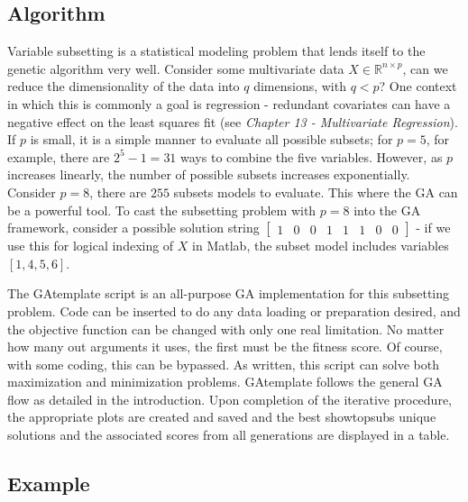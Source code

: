 \documentclass{book}
\newcommand{\textcode}[1]{\textsf{\small #1}}   %
\begin{document}
\subsection*{Algorithm}

Variable subsetting is a statistical modeling problem that lends itself to
the genetic algorithm very well. Consider some multivariate data $X\in
\mathbb{R}^{n\times p}$, can we reduce the dimensionality of the data into $%
q $ dimensions, with $q<p$? One context in which this is commonly a goal is
regression - redundant covariates can have a negative effect on the least
squares fit (see \emph{Chapter 13 - Multivariate Regression}). If $p$ is
small, it is a simple manner to evaluate all possible subsets; for $p=5$,
for example, there are $2^{5}-1=31$ ways to combine the five variables.
However, as $p$ increases linearly, the number of possible subsets increases
exponentially. Consider $p=8$, there are $255$ subsets models to evaluate.
This where the GA can be a powerful tool. To cast the subsetting problem
with $p=8$ into the GA framework, consider a possible solution string $%
\begin{bmatrix}
1 & 0 & 0 & 1 & 1 & 1 & 0 & 0%
\end{bmatrix}%
$ - if we use this for logical indexing of $X$ in Matlab, the subset model
includes variables $\left[ 1,4,5,6\right] $.

The \textcode{GAtemplate} script is an all-purpose GA
implementation for this subsetting problem. Code can be
inserted to do any data loading or preparation desired, and the
objective function can be changed with only one real
limitation. No matter how many out arguments it uses, the first
must be the fitness score. Of course, with some coding, this
can be bypassed. As written, this script can solve both
maximization and minimization problems. \textcode{GAtemplate}
follows the general GA flow as detailed in the introduction.
Upon completion of the iterative procedure, the appropriate
plots are created and saved and the best \textcode{showtopsubs}
unique solutions and the associated scores from all generations
are displayed in a table.

\subsection*{Example}
\end{document}

